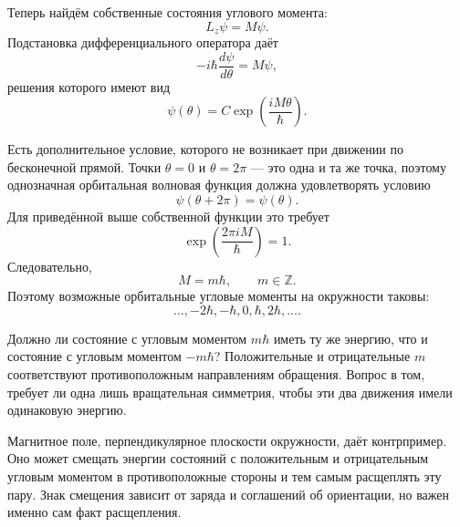 Теперь найдём собственные состояния углового момента:
\begin{equation}
L_z\psi=M\psi.
\end{equation}
Подстановка дифференциального оператора даёт
\begin{equation}
-i\hbar\frac{d\psi}{d\theta}=M\psi,
\end{equation}
решения которого имеют вид
\begin{equation}
\psi(\theta)=C\exp\left(\frac{iM\theta}{\hbar}\right).
\end{equation}

Есть дополнительное условие, которого не возникает при движении по бесконечной прямой. Точки \(\theta=0\) и \(\theta=2\pi\) — это одна и та же точка, поэтому однозначная орбитальная волновая функция должна удовлетворять условию
\begin{equation}
\psi(\theta+2\pi)=\psi(\theta).
\end{equation}
Для приведённой выше собственной функции это требует
\begin{equation}
\exp\left(\frac{2\pi iM}{\hbar}\right)=1.
\end{equation}
Следовательно,
\begin{equation}
M=m\hbar,
\qquad
m\in\mathbb Z.
\end{equation}
Поэтому возможные орбитальные угловые моменты на окружности таковы:
\begin{equation}
\ldots,-2\hbar,-\hbar,0,\hbar,2\hbar,\ldots.
\end{equation}

Должно ли состояние с угловым моментом \(m\hbar\) иметь ту же энергию, что и состояние с угловым моментом \(-m\hbar\)? Положительные и отрицательные \(m\) соответствуют противоположным направлениям обращения. Вопрос в том, требует ли одна лишь вращательная симметрия, чтобы эти два движения имели одинаковую энергию.

\begin{classroomqa}
\end{classroomqa}

Магнитное поле, перпендикулярное плоскости окружности, даёт контрпример. Оно может смещать энергии состояний с положительным и отрицательным угловым моментом в противоположные стороны и тем самым расщеплять эту пару. Знак смещения зависит от заряда и соглашений об ориентации, но важен именно сам факт расщепления.

